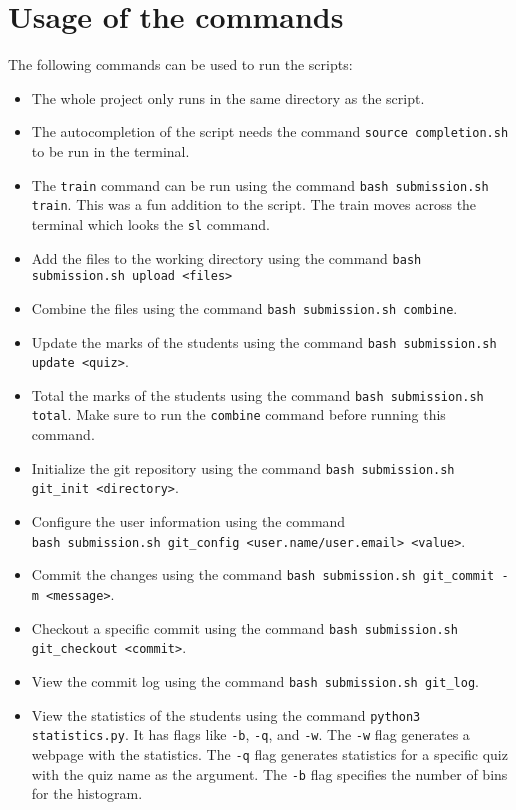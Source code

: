 \documentclass{article}
\begin{document}
\section{Usage of the commands}
The following commands can be used to run the scripts:
\begin{itemize}
    \item The whole project only runs in the same directory as the script.
    \item The autocompletion of the script needs the command \verb|source completion.sh| to be run in the terminal.
    \item The \texttt{train} command can be run using the command \verb|bash submission.sh train|. This was a fun addition to the script. The train moves across the terminal which looks the \verb|sl| command.
    \item Add the files to the working directory using the command \verb|bash submission.sh upload <files>|
    \item Combine the files using the command \verb|bash submission.sh combine|.
    \item Update the marks of the students using the command \verb|bash submission.sh update <quiz>|.
    \item Total the marks of the students using the command \verb|bash submission.sh total|. Make sure to run the \texttt{combine} command before running this command.
    \item Initialize the git repository using the command \verb|bash submission.sh git_init <directory>|.
    \item Configure the user information using the command \\ \verb|bash submission.sh git_config <user.name/user.email> <value>|.
    \item Commit the changes using the command \verb|bash submission.sh git_commit -m <message>|.
    \item Checkout a specific commit using the command \verb|bash submission.sh git_checkout <commit>|.
    \item View the commit log using the command \verb|bash submission.sh git_log|.
    \item View the statistics of the students using the command \verb|python3 statistics.py|. It has flags like \texttt{-b}, \texttt{-q}, and \texttt{-w}. The \texttt{-w} flag generates a webpage with the statistics. The \texttt{-q} flag generates statistics for a specific quiz with the quiz name as the argument. The \texttt{-b} flag specifies the number of bins for the histogram. 

\end{itemize}
\end{document}
